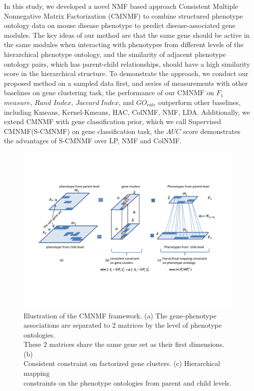 \documentclass{bmcart}
\begin{document}
In this study, we developed a novel NMF based approach Consistent Multiple Nonnegative Matrix Factorization (CMNMF) to combine structured phenotype ontology data on mouse disease phenotype to predict disease-associated gene modules. The key ideas of our method are that the same gene should be active in the same modules when interacting with phenotypes from different levels of the hierarchical phenotype ontology, and the similarity of adjacent phenotype ontology pairs, which has parent-child relationships, should have a high similarity score in the hierarchical structure. To demonstrate the approach, we conduct our proposed method on a sampled data first, and series of measurements with other baselines on gene clustering task, the performance of our CMNMF on $F_1$ $measure$, $Rand$ $Index$, $Jaccard\ Index$, and $GO_{rate}$ outperform other baselines, including Kmeans, Kernel-Kmeans\cite{Dhillon2004}, HAC\cite{Ward1963}, ColNMF\cite{Singh2008}, NMF\cite{Lee1999}, LDA\cite{Blei2003}. Additionally, we extend CMNMF with gene classification prior, which we call Supervised CMNMF(S-CMNMF) on gene classification task, the $AUC$ score demonstrates the advantages of S-CMNMF over LP\cite{Raghavan2007}, NMF and ColNMF\cite{Singh2008}.
\begin{figure}[!t]
  \centering
  \begin{minipage}{.80\linewidth}
  \centering
    \includegraphics[width=\linewidth]{DrawPictures/module2.pdf}
  \end{minipage}
  \caption{Illustration of the CMNMF framework. (a) The gene-phenotype \\ associations are separated to 2 matrices by the level of phenotype ontologies. \\These 2 matrices share the same gene set as their first dimensions. (b)\\ Consistent constraint on factorized gene clusters. (c) Hierarchical mapping \\ constraints on the phenotype ontologies from parent and child levels.}
  \label{fig:model}
\end{figure}
\end{document}
